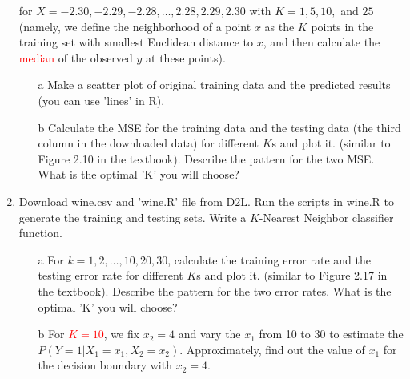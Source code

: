 \documentclass[11pt]{article}
\begin{document}
\begin{enumerate}
	for $X = -2.30, -2.29, -2.28, \ldots, 2.28, 2.29, 2.30$ with
	 $ K = 1, 5, 10,$ and $25$ (namely, we define the neighborhood of a point $x$ as the $K$ points in the training set with smallest Euclidean distance to $x$, and then calculate the \textcolor{red}{median} of the observed $y$ at these points).
\begin{itemize}
	\item[a] Make a scatter plot of original training data and the predicted results (you can use 'lines' in R). 
    \item[b] Calculate the MSE for the training data and the testing data (the third column in the downloaded data) for different $K$s and plot it. (similar to Figure 2.10 in the textbook). Describe the pattern for the two MSE. What is the optimal 'K' you will choose?
\end{itemize}	
 \item Download wine.csv and 'wine.R' file from D2L. Run the scripts in wine.R to generate the training and testing sets. Write a $K$-Nearest Neighbor classifier function. 
   \begin{itemize}
   \item[a]  For $k = 1, 2,\ldots, 10, 20, 30$, calculate the training error rate and the testing error rate for different $K$s and plot it. (similar to Figure 2.17 in the textbook). Describe the pattern for the two error rates. What is the optimal 'K' you will choose?
   \item[b] For \textcolor{red}{$K = 10$}, we fix $x_2 = 4$ and vary the  $x_1$ from 10 to  30 to estimate the $P(Y = 1 | X_1 = x_1, X_2 = x_2)$.  Approximately, find out the value of $x_1$ for the decision boundary with $x_2 = 4$. 
\end{itemize}    
  

\end{enumerate}
\end{document}
